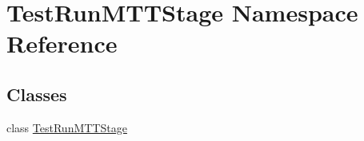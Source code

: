 \hypertarget{namespaceTestRunMTTStage}{\section{Test\-Run\-M\-T\-T\-Stage Namespace Reference}
\label{namespaceTestRunMTTStage}
}
\subsection*{Classes}
\begin{DoxyCompactItemize}
\item 
class \hyperlink{classTestRunMTTStage_1_1TestRunMTTStage}{Test\-Run\-M\-T\-T\-Stage}
\end{DoxyCompactItemize}
